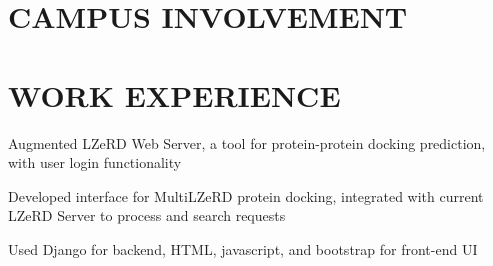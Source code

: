 \documentclass[]{deedy-resume-openfont}
\begin{document}
\begin{minipage}[t]{0.3\textwidth}
\section{CAMPUS INVOLVEMENT} 

\sectionsep



%
%

\end{minipage} 
\hfill
\begin{minipage}[t]{0.67\textwidth} 


\section{WORK EXPERIENCE}

\vspace{\topsep} %
\begin{tightemize}
\item 
\item 
\item 
\end{tightemize}
\sectionsep

\begin{tightemize}
\item Augmented LZeRD Web Server, a tool for protein-protein docking prediction, with user login functionality
\item Developed interface for MultiLZeRD protein docking, integrated with current LZeRD Server to process and search requests
\item Used Django for backend, HTML, javascript, and bootstrap for front-end UI
\end{tightemize}
\sectionsep



\end{minipage}
\end{document}
